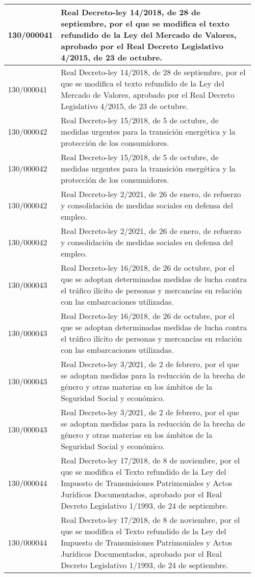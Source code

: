 {\begin{table}[H]
\begin{center}
\begin{tabularx}{\linewidth}{| l | X |}
\hline
130/000041 & Real Decreto-ley 14/2018, de 28 de septiembre, por el que se modifica el texto refundido de la Ley del Mercado de Valores, aprobado por el Real Decreto Legislativo 4/2015, de 23 de octubre. \\
\hline
130/000041 & Real Decreto-ley 14/2018, de 28 de septiembre, por el que se modifica el texto refundido de la Ley del Mercado de Valores, aprobado por el Real Decreto Legislativo 4/2015, de 23 de octubre. \\
\hline
130/000042 & Real Decreto-ley 15/2018, de 5 de octubre, de medidas urgentes para la transición energética y la protección de los consumidores. \\
\hline
130/000042 & Real Decreto-ley 15/2018, de 5 de octubre, de medidas urgentes para la transición energética y la protección de los consumidores. \\
\hline
130/000042 & Real Decreto-ley 2/2021, de 26 de enero, de refuerzo y consolidación de medidas sociales en defensa del empleo. \\
\hline
130/000042 & Real Decreto-ley 2/2021, de 26 de enero, de refuerzo y consolidación de medidas sociales en defensa del empleo. \\
\hline
130/000043 & Real Decreto-ley 16/2018, de 26 de octubre, por el que se adoptan determinadas medidas de lucha contra el tráfico ilícito de personas y mercancías en relación con las embarcaciones utilizadas. \\
\hline
130/000043 & Real Decreto-ley 16/2018, de 26 de octubre, por el que se adoptan determinadas medidas de lucha contra el tráfico ilícito de personas y mercancías en relación con las embarcaciones utilizadas. \\
\hline
130/000043 & Real Decreto-ley 3/2021, de 2 de febrero, por el que se adoptan medidas para la reducción de la brecha de género y otras materias en los ámbitos de la Seguridad Social y económico. \\
\hline
130/000043 & Real Decreto-ley 3/2021, de 2 de febrero, por el que se adoptan medidas para la reducción de la brecha de género y otras materias en los ámbitos de la Seguridad Social y económico. \\
\hline
130/000044 & Real Decreto-ley 17/2018, de 8 de noviembre, por el que se modifica el Texto refundido de la Ley del Impuesto de Transmisiones Patrimoniales y Actos Jurídicos Documentados, aprobado por el Real Decreto Legislativo 1/1993, de 24 de septiembre. \\
\hline
130/000044 & Real Decreto-ley 17/2018, de 8 de noviembre, por el que se modifica el Texto refundido de la Ley del Impuesto de Transmisiones Patrimoniales y Actos Jurídicos Documentados, aprobado por el Real Decreto Legislativo 1/1993, de 24 de septiembre. \\

\end{tabularx}
\end{center}
\end{table}}
